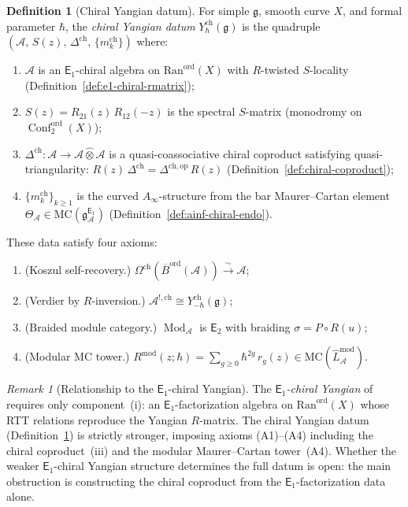 \documentclass[11pt,reqno]{amsart}
\theoremstyle{definition}
\newtheorem{definition}[theorem]{Definition}
\theoremstyle{remark}
\newtheorem{remark}[theorem]{Remark}
\newcommand{\cA}{\mathcal{A}}
\newcommand{\Ran}{\mathrm{Ran}}
\newcommand{\MC}{\mathrm{MC}}
\newcommand{\Ainf}{A_{\infty}}
\newcommand{\Eone}{\mathsf{E}_{1}}
\newcommand{\Etwo}{\mathsf{E}_{2}}
\DeclareMathOperator{\Conf}{Conf}
\newcommand{\fg}{\mathfrak{g}}
\newcommand{\gEone}{\mathfrak{g}^{\Eone}_{\cA}}
\newcommand{\Barord}{\overline{B}^{\mathrm{ord}}}
\newcommand{\op}{\mathrm{op}}
\DeclareMathOperator{\Mod}{Mod}
\numberwithin{equation}{section}
\begin{document}
\begin{definition}[Chiral Yangian datum]
\label{def:chiral-yangian-datum}
For simple $\fg$, smooth curve $X$, and formal parameter
$\hbar$, the \emph{chiral Yangian datum}
$Y^{\mathrm{ch}}_\hbar(\fg)$ is the quadruple
$(\cA,\, S(z),\, \Delta^{\mathrm{ch}},\,
\{m_k^{\mathrm{ch}}\})$ where:
\begin{enumerate}[label=\textup{(\roman*)}]
\item $\cA$ is an $\Eone$-chiral algebra on
  $\Ran^{\mathrm{ord}}(X)$ with $R$-twisted $S$-locality
  \textup{(}Definition~\textup{\ref{def:e1-chiral-rmatrix}}\textup{)};
\item $S(z) = R_{21}(z)\, R_{12}(-z)$ is the spectral
  $S$-matrix \textup{(}monodromy on
  $\Conf_2^{\mathrm{ord}}(X)$\textup{)};
\item $\Delta^{\mathrm{ch}} \colon
  \cA \to \cA \mathbin{\hat{\otimes}} \cA$ is a
  quasi-coassociative chiral coproduct satisfying
  quasi-triangularity:
  $R(z)\, \Delta^{\mathrm{ch}}
  = \Delta^{\mathrm{ch},\op}\, R(z)$
  \textup{(}Definition~\textup{\ref{def:chiral-coproduct}}\textup{)};
\item $\{m_k^{\mathrm{ch}}\}_{k \geq 1}$ is the curved
  $\Ainf$-structure from the bar Maurer--Cartan element
  $\Theta_\cA \in \MC(\gEone)$
  \textup{(}Definition~\textup{\ref{def:ainf-chiral-endo}}\textup{)}.
\end{enumerate}
These data satisfy four axioms:
\begin{enumerate}[label=\textup{(A\arabic*)}]
\item \textup{(Koszul self-recovery.)}
  $\Omega^{\mathrm{ch}}(\Barord(\cA))
  \xrightarrow{\;\sim\;} \cA$;
\item \textup{(Verdier by $R$-inversion.)}
  $\cA^{!,\mathrm{ch}}
  \cong Y^{\mathrm{ch}}_{-\hbar}(\fg)$;
\item \textup{(Braided module category.)}
  $\Mod_\cA$ is $\Etwo$ with braiding
  $\sigma = P \circ R(u)$;
\item \textup{(Modular MC tower.)}
  $R^{\mathrm{mod}}(z;\hbar)
  = \sum_{g \geq 0} \hbar^{2g}\, r_g(z)
  \in \MC(\widehat{L}^{\mathrm{mod}}_\cA)$.
\end{enumerate}
\end{definition}

\begin{remark}[Relationship to the $\Eone$-chiral Yangian]
\label{rem:chiral-yangian-datum-vs-e1}
The \emph{$\Eone$-chiral Yangian} of
\cite[\S III]{Lorgat26I} requires only
component~(i): an $\Eone$-factorization algebra on
$\Ran^{\mathrm{ord}}(X)$ whose RTT relations reproduce
the Yangian $R$-matrix. The chiral Yangian datum
(Definition~\ref{def:chiral-yangian-datum}) is strictly
stronger, imposing axioms (A1)--(A4) including the chiral
coproduct~(iii) and the modular Maurer--Cartan
tower~(A4). Whether the weaker $\Eone$-chiral Yangian
structure determines the full datum is open: the main
obstruction is constructing the chiral coproduct from
the $\Eone$-factorization data alone.
\end{remark}
\end{document}
